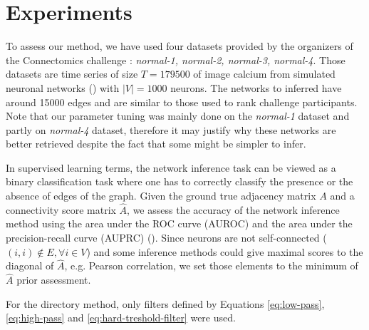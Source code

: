 \documentclass[wcp]{jmlr}
\begin{document}
\section{Experiments}

To assess our method, we have used four datasets provided by the organizers
of the Connectomics challenge : \textit{normal-1, normal-2, normal-3, normal-4}.
Those datasets are time series of size $T=179500$ of image calcium from simulated
neuronal networks (\cite{stetter2012model}) with $|V|=1000$ neurons. The networks
to inferred have around 15000 edges and are similar to those
used to rank challenge participants. Note that our parameter tuning was mainly
done on the \textit{normal-1} dataset and partly on \textit{normal-4} dataset,
therefore it may justify why these networks are better retrieved despite the
fact that some might be simpler to infer.

In supervised learning terms, the network inference task can be viewed as a
binary classification task where one has to correctly classify the presence
or the absence of edges of the graph. Given the ground true adjacency matrix
$A$ and a connectivity score matrix $\hat{A}$, we assess the accuracy of the
network inference method using the area under the ROC curve (AUROC)
and the area under the precision-recall curve (AUPRC)
(\cite{schrynemackers2013protocols}). Since neurons are not self-connected
($(i, i) \not \in E, \forall i \in V$) and some inference methods could
give maximal scores to the diagonal of $\hat{A}$, e.g. Pearson
correlation, we set those elements to the minimum of $\hat{A}$ prior
assessment.



For the directory method, only filters defined by Equations
\ref{eq:low-pass}, \ref{eq:high-pass} and \ref{eq:hard-treshold-filter} were
used.
\end{document}
